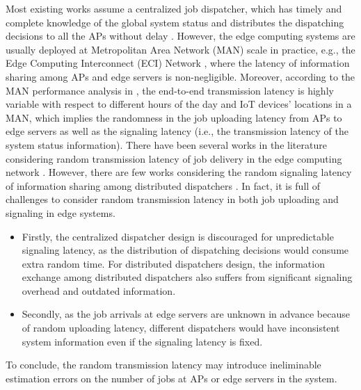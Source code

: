 Most existing works assume a centralized job dispatcher, which has timely and complete knowledge of the global system status and distributes the dispatching decisions to all the APs without delay \cite{tan-online,IOTJ18-FanQ,mdp-globecom,mdp-tvt,MASS18-MengZ}.
However, the edge computing systems are usually deployed at Metropolitan Area Network (MAN) scale in practice, e.g., the Edge Computing Interconnect (ECI) Network \cite{MAN-ECI}, where the latency of information sharing among APs and edge servers is non-negligible. Moreover, according to the MAN performance analysis in \cite{MAN-LATENCY}, the end-to-end transmission latency is highly variable with respect to different hours of the day and IoT devices' locations in a MAN, which implies the randomness in the job uploading latency from APs to edge servers as well as the signaling latency (i.e., the transmission latency of the {system status} information).
There have been several works in the literature considering random transmission latency of job delivery in the edge computing network \cite{latency-EDGE19,MOBIHOC19-ZhouZ,IOTJ18-FanQ,TOC19-LiuC,JSAC19-AlameddineHA}.
However, there are few works considering the random signaling latency of information sharing among distributed dispatchers \cite{tan-online,TWC18-LyuX}.
In fact, it is full of {challenges} to consider random transmission latency in both job uploading and signaling in edge systems.
\begin{itemize}
    \item Firstly, the centralized dispatcher design is discouraged for unpredictable signaling latency, as the distribution of dispatching decisions would consume extra random time. For distributed dispatchers design, the information exchange among distributed dispatchers also suffers from significant signaling overhead and outdated information.
    \item Secondly, as the job arrivals at edge servers are unknown in advance because of random uploading latency, different dispatchers would have inconsistent system information even if the signaling latency is fixed.
\end{itemize}

To conclude, the random transmission latency may introduce ineliminable estimation errors on the number of jobs at APs or edge servers in the system.



